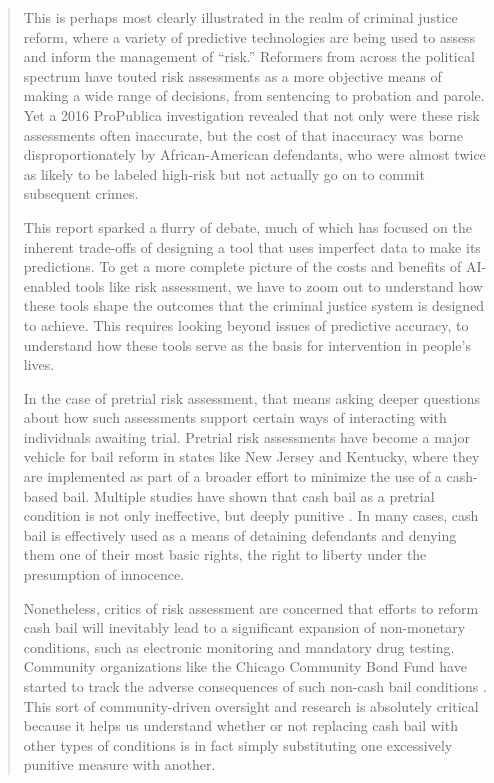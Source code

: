 \begin{quote}
This is perhaps most clearly illustrated in the realm of criminal justice reform, where a variety of predictive technologies are being used to assess and inform the management of ``risk.'' Reformers from across the political spectrum have touted risk assessments as a more objective means of making a wide range of decisions, from sentencing to probation and parole. Yet a 2016 ProPublica \cite{angwin2016machine} investigation revealed that not only were these risk assessments often inaccurate, but the cost of that inaccuracy was borne disproportionately by African-American defendants, who were almost twice as likely to be labeled high-risk but not actually go on to commit subsequent crimes. 

This report sparked a flurry of debate, much of which has focused on the inherent trade-offs \cite{kleinberg2016inherent} of designing a tool that uses imperfect data to make its predictions. To get a more complete picture of the costs and benefits of \ac{AI}-enabled tools like risk assessment, we have to zoom out to understand how these tools shape the outcomes that the criminal justice system is designed to achieve. This requires looking beyond issues of predictive accuracy, to understand how these tools serve as the basis for intervention in people's lives. 
 
In the case of pretrial risk assessment, that means asking deeper questions about how such assessments support certain ways of interacting with individuals awaiting trial. Pretrial risk assessments have become a major vehicle for bail reform in states like New Jersey and Kentucky, where they are implemented as part of a broader effort to minimize the use of a cash-based bail. Multiple studies have shown that cash bail as a pretrial condition is not only ineffective, but deeply punitive \cite{lum2017causal,heaton2017downstream}. In many cases, cash bail is effectively used as a means of detaining defendants and denying them one of their most basic rights, the right to liberty under the presumption of innocence. 
 
Nonetheless, critics of risk assessment are concerned that efforts to reform cash bail will inevitably lead to a significant expansion of non-monetary conditions, such as electronic monitoring and mandatory drug testing. Community organizations like the Chicago Community Bond Fund have started to track the adverse consequences of such non-cash bail conditions \cite{pretrial36:online}. This sort of community-driven oversight and research is absolutely critical because it helps us understand whether or not replacing cash bail with other types of conditions is in fact simply substituting one excessively punitive measure with another. 


\end{quote}
